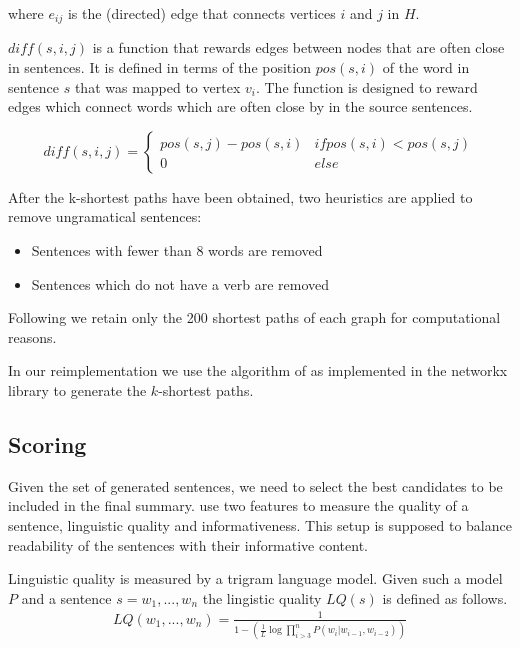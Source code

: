 \documentclass[a4paper,BCOR=10mm]{report}
\numberwithin{lemma}{chapter}
\numberwithin{definition}{chapter}
\begin{document}
where $e_{ij}$ is the (directed) edge that connects vertices $i$ and $j$ in $H$.

$\mathit{diff}(s, i, j)$ is a function that rewards edges between nodes that are often close in sentences. It is defined in terms of the position $\mathit{pos}(s, i)$ of the word in sentence $s$ that was mapped to vertex $v_i$.
The function is designed to reward edges which connect words which are often close by in the source sentences.

\begin{equation}
\mathit{diff}(s, i, j) = \begin{cases}
\mathit{pos}(s, j) - \mathit{pos}(s, i) & \mathit{if }\mathit{pos}(s, i) < \mathit{pos}(s, j) \\
0 & \mathit{else}
\end{cases}
\end{equation}

After the k-shortest paths have been obtained, two heuristics are applied to remove ungramatical sentences:

\begin{itemize}
    \item {Sentences with fewer than $8$ words are removed}
    \item {Sentences which do not have a verb are removed}
\end{itemize}

Following \citet{banerjee} we retain only the 200 shortest paths of each graph for computational reasons.

In our reimplementation we use the algorithm of \citet{kshortestpath} as implemented in the networkx library \citep{networkx} to generate the $k$-shortest paths. %

\subsection{Scoring}

Given the set of generated sentences, we need to select the best candidates to be included in the final summary. \citet{banerjee} use two features to measure the quality of a sentence, linguistic quality and informativeness. This setup is supposed to balance readability of the sentences with their informative content.

Linguistic quality is measured by a trigram language model. Given such a model $P$ and a sentence $s = w_1, ..., w_n$ the lingistic quality $LQ(s)$ is defined as follows.
\begin{align}
LQ(w_1, ..., w_n) = \frac{1}{1 - (\frac{1}{L} \log \prod_{i > 3}^{n} P(w_i | w_{i - 1}, w_{i - 2}))}
\end{align}
\end{document}
